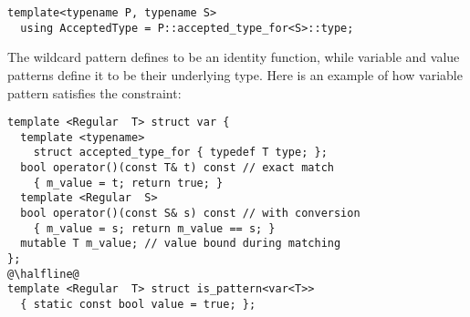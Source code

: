 \begin{lstlisting}
template<typename P, typename S>
  using AcceptedType = P::accepted_type_for<S>::type;
\end{lstlisting}

\noindent
The wildcard pattern defines  to be an identity 
function, while variable and value patterns define it to be their underlying 
type. Here is an example of how variable pattern satisfies the  
constraint:

\begin{lstlisting}
template <Regular  T> struct var {
  template <typename> 
    struct accepted_type_for { typedef T type; };
  bool operator()(const T& t) const // exact match
    { m_value = t; return true; }
  template <Regular  S> 
  bool operator()(const S& s) const // with conversion
    { m_value = s; return m_value == s; }
  mutable T m_value; // value bound during matching
};
@\halfline@
template <Regular  T> struct is_pattern<var<T>> 
  { static const bool value = true; };
\end{lstlisting}

